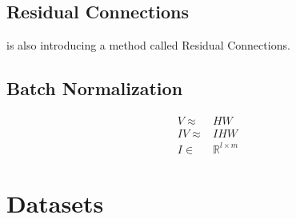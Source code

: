\subsection{Residual Connections}
\cite{He:2015aa} is also introducing a method called Residual Connections.
\subsection{Batch Normalization}
\begin{equation}
\begin{split}
V \approx& HW \\
IV \approx& IHW\\
I \in& \mathbb{R}^{l \times m}
\end{split}
\end{equation}


\section{Datasets}


























